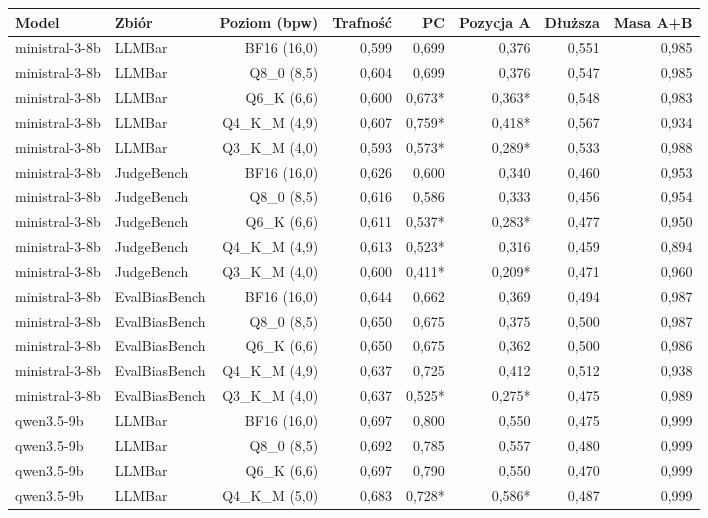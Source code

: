 \begin{tabular}{llrrrrrr}
\toprule
Model & Zbiór & Poziom (bpw) & Trafność & PC & Pozycja A & Dłuższa & Masa A+B \\
\midrule
ministral-3-8b & LLMBar & BF16 (16,0) & 0,599 & 0,699 & 0,376 & 0,551 & 0,985 \\
ministral-3-8b & LLMBar & Q8\_0 (8,5) & 0,604 & 0,699 & 0,376 & 0,547 & 0,985 \\
ministral-3-8b & LLMBar & Q6\_K (6,6) & 0,600 & 0,673* & 0,363* & 0,548 & 0,983 \\
ministral-3-8b & LLMBar & Q4\_K\_M (4,9) & 0,607 & 0,759* & 0,418* & 0,567 & 0,934 \\
ministral-3-8b & LLMBar & Q3\_K\_M (4,0) & 0,593 & 0,573* & 0,289* & 0,533 & 0,988 \\
\midrule
ministral-3-8b & JudgeBench & BF16 (16,0) & 0,626 & 0,600 & 0,340 & 0,460 & 0,953 \\
ministral-3-8b & JudgeBench & Q8\_0 (8,5) & 0,616 & 0,586 & 0,333 & 0,456 & 0,954 \\
ministral-3-8b & JudgeBench & Q6\_K (6,6) & 0,611 & 0,537* & 0,283* & 0,477 & 0,950 \\
ministral-3-8b & JudgeBench & Q4\_K\_M (4,9) & 0,613 & 0,523* & 0,316 & 0,459 & 0,894 \\
ministral-3-8b & JudgeBench & Q3\_K\_M (4,0) & 0,600 & 0,411* & 0,209* & 0,471 & 0,960 \\
\midrule
ministral-3-8b & EvalBiasBench & BF16 (16,0) & 0,644 & 0,662 & 0,369 & 0,494 & 0,987 \\
ministral-3-8b & EvalBiasBench & Q8\_0 (8,5) & 0,650 & 0,675 & 0,375 & 0,500 & 0,987 \\
ministral-3-8b & EvalBiasBench & Q6\_K (6,6) & 0,650 & 0,675 & 0,362 & 0,500 & 0,986 \\
ministral-3-8b & EvalBiasBench & Q4\_K\_M (4,9) & 0,637 & 0,725 & 0,412 & 0,512 & 0,938 \\
ministral-3-8b & EvalBiasBench & Q3\_K\_M (4,0) & 0,637 & 0,525* & 0,275* & 0,475 & 0,989 \\
\midrule
qwen3.5-9b & LLMBar & BF16 (16,0) & 0,697 & 0,800 & 0,550 & 0,475 & 0,999 \\
qwen3.5-9b & LLMBar & Q8\_0 (8,5) & 0,692 & 0,785 & 0,557 & 0,480 & 0,999 \\
qwen3.5-9b & LLMBar & Q6\_K (6,6) & 0,697 & 0,790 & 0,550 & 0,470 & 0,999 \\
qwen3.5-9b & LLMBar & Q4\_K\_M (5,0) & 0,683 & 0,728* & 0,586* & 0,487 & 0,999 \\

\end{tabular}
